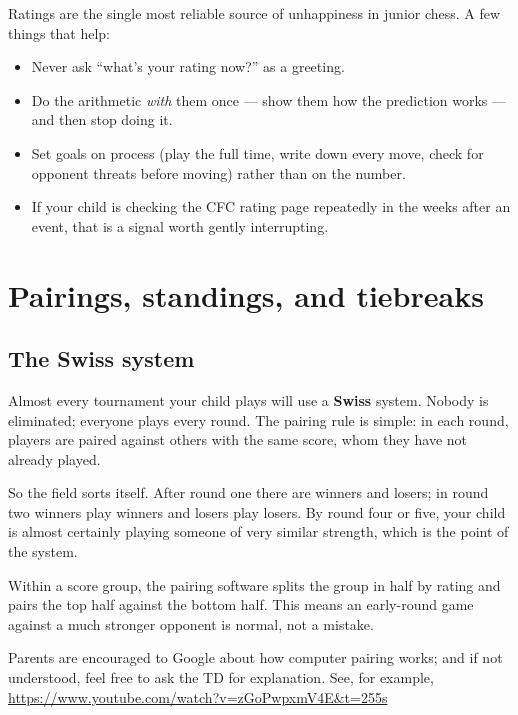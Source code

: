 \documentclass[10pt,letterpaper]{article}
\newcommand{\term}[1]{\textbf{#1}}
\begin{document}
Ratings are the single most reliable source of unhappiness in junior chess.
A few things that help:

\begin{itemize}
  \item Never ask ``what's your rating now?'' as a greeting.
  \item Do the arithmetic \emph{with} them once --- show them how the
        prediction works --- and then stop doing it.
  \item Set goals on process (play the full time, write down every move, check
        for opponent threats before moving) rather than on the number.
  \item If your child is checking the CFC rating page repeatedly in the weeks
        after an event, that is a signal worth gently interrupting.
\end{itemize}

\section{Pairings, standings, and tiebreaks}
\label{sec:pairings}

\subsection{The Swiss system}

Almost every tournament your child plays will use a \term{Swiss} system. Nobody
is eliminated; everyone plays every round. The pairing rule is simple: in each
round, players are paired against others with the same score, whom they have
not already played.

So the field sorts itself. After round one there are winners and losers; in
round two winners play winners and losers play losers. By round four or five,
your child is almost certainly playing someone of very similar strength, which
is the point of the system.

Within a score group, the pairing software splits the group in half by rating
and pairs the top half against the bottom half. This means an early-round game
against a much stronger opponent is normal, not a mistake.

Parents are encouraged to Google about how computer pairing works; and if not understood, feel free to ask the TD for explanation. See, for example, \url{https://www.youtube.com/watch?v=zGoPwpxmV4E&t=255s}
\end{document}

